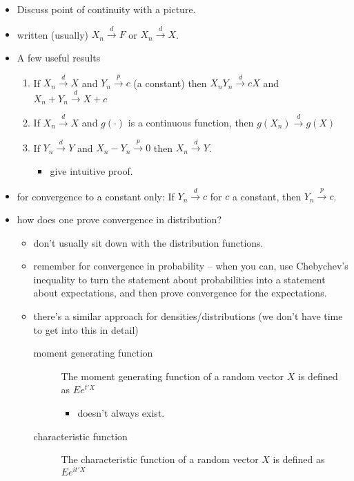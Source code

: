 \begin{itemize}
\item Discuss point of continuity with a picture.
\item written (usually) $X_n \xrightarrow{d} F$ or $X_n
       \xrightarrow{d} X$.
\item A few useful results \citep[D.16]{Gre_2011}
\begin{enumerate}
\item If $X_n \xrightarrow{d} X$ and $Y_n \xrightarrow{p} c$ (a
          constant) then $X_n Y_n \xrightarrow{d} c X$ and $X_n + Y_n
          \xrightarrow{d} X + c$
\item If $X_n \xrightarrow{d} X$ and $g(\cdot)$ is a continuous
          function, then $g(X_n)\xrightarrow{d} g(X)$
\item If $Y_n \xrightarrow{d} Y$ and $X_n - Y_n \xrightarrow{p} 0$
          then $X_n \xrightarrow{d} Y$.
\begin{itemize}
\item give intuitive proof.
\end{itemize}
\end{enumerate}
\item for convergence to a constant only: If $Y_n \xrightarrow{d} c$
       for $c$ a constant, then $Y_n \xrightarrow{p} c$.
\item how does one prove convergence in distribution?
\begin{itemize}
\item don't usually sit down with the distribution functions.
\item remember for convergence in probability -- when you can, use
         Chebychev's inequality to turn the statement about
         probabilities into a statement about expectations, and then
         prove convergence for the expectations.
\item there's a similar approach for densities/distributions (we
         don't have time to get into this in detail)
\begin{description}
\item[moment generating function] The moment generating function
              of a random vector $X$ is defined as $E e^{t'X}$
\begin{itemize}
\item doesn't always exist.
\end{itemize}
\item[characteristic function] The characteristic function of a
              random vector $X$ is defined as $E e^{it'X}$
\begin{itemize}

\end{itemize}
\end{description}
\end{itemize}
\end{itemize}
